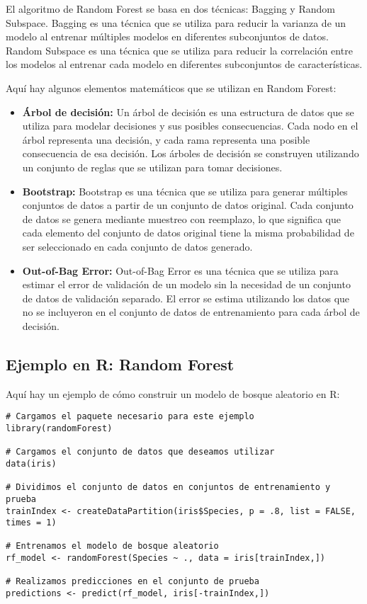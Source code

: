 \documentclass[12pt]{article}
\begin{document}
El algoritmo de Random Forest se basa en dos técnicas: Bagging y Random Subspace. Bagging es una técnica que se utiliza para reducir la varianza de un modelo al entrenar múltiples modelos en diferentes subconjuntos de datos. Random Subspace es una técnica que se utiliza para reducir la correlación entre los modelos al entrenar cada modelo en diferentes subconjuntos de características.

Aquí hay algunos elementos matemáticos que se utilizan en Random Forest:

\begin{itemize}
    \item \textbf{Árbol de decisión:} Un árbol de decisión es una estructura de datos que se utiliza para modelar decisiones y sus posibles consecuencias. Cada nodo en el árbol representa una decisión, y cada rama representa una posible consecuencia de esa decisión. Los árboles de decisión se construyen utilizando un conjunto de reglas que se utilizan para tomar decisiones.
    \item \textbf{Bootstrap:} Bootstrap es una técnica que se utiliza para generar múltiples conjuntos de datos a partir de un conjunto de datos original. Cada conjunto de datos se genera mediante muestreo con reemplazo, lo que significa que cada elemento del conjunto de datos original tiene la misma probabilidad de ser seleccionado en cada conjunto de datos generado.
    \item \textbf{Out-of-Bag Error:} Out-of-Bag Error es una técnica que se utiliza para estimar el error de validación de un modelo sin la necesidad de un conjunto de datos de validación separado. El error se estima utilizando los datos que no se incluyeron en el conjunto de datos de entrenamiento para cada árbol de decisión.
\end{itemize}

\subsection{Ejemplo en R: Random Forest}

Aquí hay un ejemplo de cómo construir un modelo de bosque aleatorio en R:

\begin{verbatim}
# Cargamos el paquete necesario para este ejemplo
library(randomForest)

# Cargamos el conjunto de datos que deseamos utilizar
data(iris)

# Dividimos el conjunto de datos en conjuntos de entrenamiento y prueba
trainIndex <- createDataPartition(iris$Species, p = .8, list = FALSE, times = 1)

# Entrenamos el modelo de bosque aleatorio
rf_model <- randomForest(Species ~ ., data = iris[trainIndex,])

# Realizamos predicciones en el conjunto de prueba
predictions <- predict(rf_model, iris[-trainIndex,])
\end{verbatim}
\end{document}
